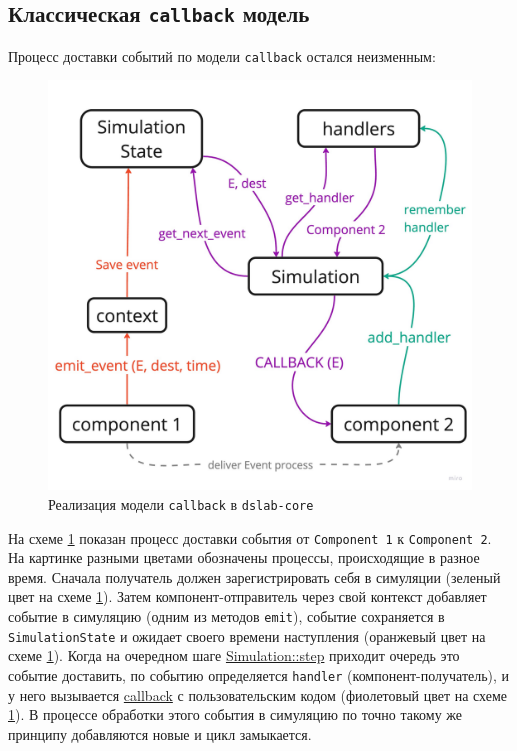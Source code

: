 \subsection{Классическая \texttt{callback} модель}
Процесс доставки событий по модели \texttt{callback} остался неизменным: 
\nopagebreak
\begin{figure}[H]
    \centering
    \includegraphics[width=0.7\linewidth]{images/dslab-core-callback.pdf}
    \caption{Реализация модели \texttt{callback} в \texttt{dslab-core}}
    \label{dslab_inner}
\end{figure}

На схеме \ref{dslab_inner} показан процесс доставки события от \texttt{Component~1} к \texttt{Component~2}. На картинке разными цветами обозначены процессы, происходящие в разное время. Сначала получатель должен зарегистрировать себя в симуляции (зеленый цвет на схеме \ref{dslab_inner}). Затем компонент-отправитель через свой контекст добавляет событие в симуляцию (одним из методов \texttt{emit}), событие сохраняется в \texttt{SimulationState} и ожидает своего времени наступления (оранжевый цвет на схеме \ref{dslab_inner}). Когда на очередном шаге \hyperref[Simulation::step]{Simulation::step} приходит очередь это событие доставить, по событию определяется \texttt{handler} (компонент-получатель), и у него вызывается \hyperref[fnon]{callback} с пользовательским кодом (фиолетовый цвет на схеме \ref{dslab_inner}). В процессе обработки этого события в симуляцию по точно такому же принципу добавляются новые и цикл замыкается.


